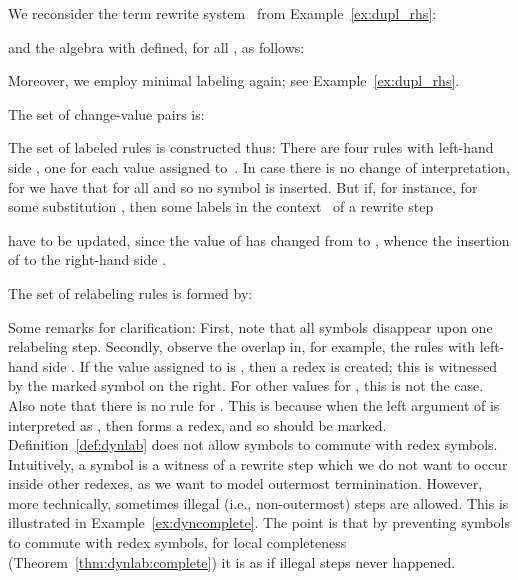 \begin{example}
  We reconsider the term rewrite system~ from Example~\ref{ex:dupl_rhs}:
  
  and the algebra  
  with  defined, for all , as follows:
  
  Moreover, we employ minimal labeling again; see Example~\ref{ex:dupl_rhs}. 

  The set of change-value pairs is:
  
  The set  of labeled rules is constructed thus: 
  There are four rules with left-hand side ,
  one for each value assigned to~. 
  In case  there is no change of interpretation, 
  for we have that  for all 
  and so no  symbol is inserted.
  But if, for instance,  for some substitution ,
  then some labels in the context~ of a rewrite step 
  
  have to be updated, since the value of  has changed from  to ,
  whence the insertion of  to the right-hand side .

  The set  
  of relabeling rules is formed by:
  
  Some remarks for clarification: 
  First, note that all  symbols disappear upon one relabeling step.
  Secondly, observe the overlap in, for example, the rules with left-hand side 
  .
  If the value assigned to  is , 
  then a redex is created; this is witnessed by the marked symbol  on the right.
  For other values for , this is not the case.
  Also note that there is no rule for
  . 
  This is because when the left argument of  is interpreted as ,
  then  forms a redex, and so  should be marked. 
  Definition~\ref{def:dynlab} does not allow  symbols 
  to commute with redex symbols.
  Intuitively, a  symbol is a witness of a rewrite step 
  which we do not want to occur inside other redexes, as we want to model outermost terminination. 
  However, more technically, sometimes illegal (i.e., non-outermost)  steps are allowed.
  This is illustrated in Example~\ref{ex:dyncomplete}.
  The point is that by preventing  symbols to commute with redex symbols,
  for local completeness (Theorem~\ref{thm:dynlab:complete})
  it is as if illegal steps never happened.
\end{example}

